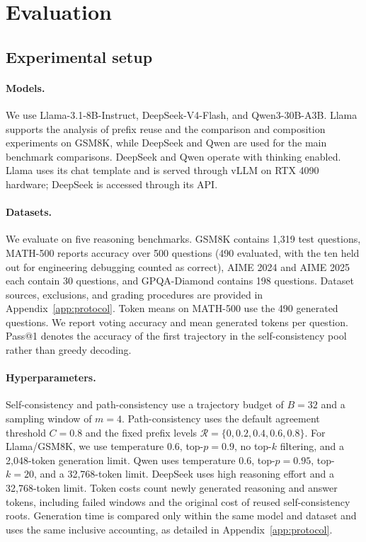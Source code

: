 \section{Evaluation}
\label{sec:evaluation}
\subsection{Experimental setup}
\label{sec:setup}
\paragraph{Models.}
We use Llama-3.1-8B-Instruct, DeepSeek-V4-Flash, and Qwen3-30B-A3B. Llama supports the analysis of prefix reuse and the comparison and composition experiments on GSM8K, while DeepSeek and Qwen are used for the main benchmark comparisons. DeepSeek and Qwen operate with thinking enabled. Llama uses its chat template and is served through vLLM on RTX 4090 hardware; DeepSeek is accessed through its API.

\paragraph{Datasets.}
We evaluate on five reasoning benchmarks. GSM8K contains 1,319 test questions, MATH-500 reports accuracy over 500 questions (490 evaluated, with the ten held out for engineering debugging counted as correct), AIME 2024 and AIME 2025 each contain 30 questions, and GPQA-Diamond contains 198 questions. Dataset sources, exclusions, and grading procedures are provided in Appendix~\ref{app:protocol}. Token means on MATH-500 use the 490 generated questions. We report voting accuracy and mean generated tokens per question. Pass@1 denotes the accuracy of the first trajectory in the self-consistency pool rather than greedy decoding.

\paragraph{Hyperparameters.}
Self-consistency and path-consistency use a trajectory budget of $B=32$ and a sampling window of $m=4$. Path-consistency uses the default agreement threshold $C=0.8$ and the fixed prefix levels $\mathcal R=\{0,0.2,0.4,0.6,0.8\}$. For Llama/GSM8K, we use temperature 0.6, top-$p=0.9$, no top-$k$ filtering, and a 2,048-token generation limit. Qwen uses temperature 0.6, top-$p=0.95$, top-$k=20$, and a 32,768-token limit. DeepSeek uses high reasoning effort and a 32,768-token limit. Token costs count newly generated reasoning and answer tokens, including failed windows and the original cost of reused self-consistency roots. Generation time is compared only within the same model and dataset and uses the same inclusive accounting, as detailed in Appendix~\ref{app:protocol}.

